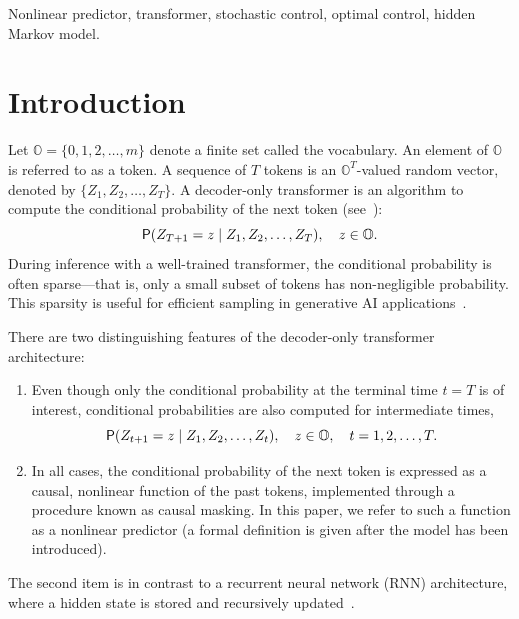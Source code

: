 \documentclass[twoside,11pt]{article}
\def\bO{\mathbb{O}}
\def\sP{{\sf P}}
\begin{document}
\begin{keywords}
  Nonlinear predictor, transformer, stochastic control, optimal control, hidden
  Markov model.
\end{keywords}

\section{Introduction}
\label{sec:intro}

Let $\bO=\{0,1,2,\hdots,m\}$ denote a finite set called the vocabulary.
An element of $\bO$ is referred to as a token.
A sequence of $T$ tokens is an $\bO^T$-valued random vector, denoted by
$\{Z_1,Z_2,\hdots,Z_T\}$.
A decoder-only transformer is an algorithm to compute the conditional probability of the next token (see~\cite{phuong2022formal}):
\begin{equation*}
  \sP(Z_{T+1}=z \mid Z_1,Z_{2},\hdots,Z_T),\quad z\in \bO.  
\end{equation*}
During inference with a well-trained transformer, the conditional probability is often sparse---that is, only a small subset of tokens has non-negligible probability. This sparsity is useful  for efficient sampling in generative AI applications~\citep{wolfram2023chatgpt}.

There are two distinguishing features of the decoder-only transformer architecture:
\begin{enumerate}
  \item Even though only the conditional probability at the terminal time $t=T$ is of interest, conditional probabilities are also computed for intermediate times,
    \begin{equation*}
      \sP(Z_{t+1}=z \mid Z_1,Z_2,\hdots,Z_t),\quad z\in \bO,\quad t=1,2,\hdots,T.
    \end{equation*}

  \item In all cases, the conditional probability of the next token is expressed as a causal, nonlinear function of the past tokens, implemented through a procedure known as causal masking. 
  In this paper, we refer to such a function as a nonlinear predictor (a formal definition is given after the model has been introduced).  
\end{enumerate}
The second item is in contrast to a
recurrent neural network (RNN) architecture, where a hidden state is
stored and recursively updated~\citep{graves2013generating,dai2019transformer}.  
\end{document}
